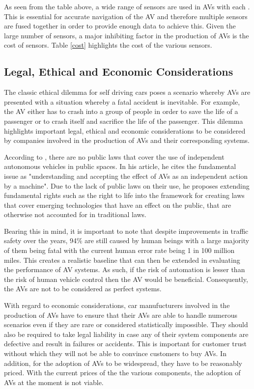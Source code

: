 As seen from the table above, a wide range of sensors are used in AVs with each . This is essential for accurate navigation of the AV and therefore multiple sensors are fused together in order to provide enough data to achieve this. Given the large number of sensors, a major inhibiting factor in the production of AVs is the cost of sensors. Table \ref{cost} highlights the cost of the various sensors.



\subsection{Legal, Ethical and Economic Considerations}

The classic ethical dilemma for self driving cars poses a scenario whereby AVs are presented with a situation whereby a fatal accident is inevitable. For example, the AV either has to crash into a group of people in order to save the life of a passenger or to crash itself and sacrifice the life of the passenger. This dilemma highlights important legal, ethical and economic considerations to be considered by companies involved in the production of AVs and their corresponding systems. 


According to \cite{gasser2016fundamental}, there are no public laws that cover the  use of independent autonomous vehicles in public spaces. In his article, he cites the fundamental issue as "understanding and accepting the effect of AVs as an independent action by a machine". Due to the lack of public laws on their use, he proposes extending fundamental rights such as the right to life into the framework for creating laws that cover emerging technologies that have an effect on the public, that are otherwise not accounted for in traditional laws. 

Bearing this in mind, it is important to note that despite improvements in traffic safety over the years, 94\% are still caused by human beings with a large majority of them being fatal with the current human error rate being 1 in 100 million miles. This creates a realistic baseline that can then be extended in evaluating the performance of AV systems. As such, if the risk of automation is lesser than the risk of human vehicle control then the AV would be beneficial. Consequently, the AVs are not to be considered as perfect systems.

With regard to economic considerations, car manufucturers involved in the production of AVs have to ensure that their AVs are able to handle numerous scenarios even if they are rare or considered statistically impossible. They should also be required to take legal liability in case any of their system components are defective and result in failures or accidents. This is important for customer trust without which they will not be able to convince customers to buy AVs. In addition, for the adoption of AVs to be widespread, they have to be reasonably priced. With the current prices of the the various components, the adoption of AVs at the moment is not viable. 


